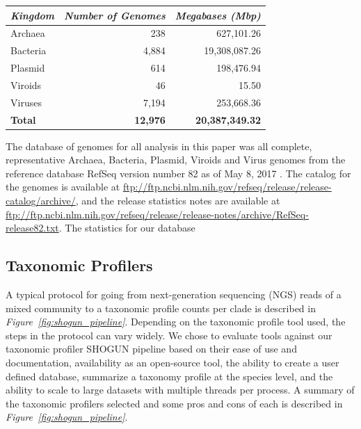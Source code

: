 \documentclass[conference,11pt]{IEEEtran}
\begin{document}
\begin{table}[hbt]
  \centering
  \begin{tabular}{l|r|r}
      \textit{Kingdom} & \textit{Number of Genomes} & \textit{Megabases (Mbp)} \\ \hline
      Archaea & 238 & 627,101.26\\ \hline
      Bacteria & 4,884 & 19,308,087.26\\ \hline
      Plasmid & 614 & 198,476.94\\ \hline
      Viroids & 46 & 15.50\\ \hline
      Viruses & 7,194 & 253,668.36\\ \hline \hline
      \textbf{Total} & \textbf{12,976} & \textbf{20,387,349.32}\\ 
  \end{tabular}
  \label{table:database_stats}
\end{table}

The database of genomes for all analysis in this paper was all complete, representative Archaea, Bacteria, Plasmid, Viroids and Virus genomes from the reference database RefSeq version number 82 as of May 8, 2017 \cite{tatusova_refseq_2014}. The catalog for the genomes is available at \url{ftp://ftp.ncbi.nlm.nih.gov/refseq/release/release-catalog/archive/}, and the release statistics notes are available at \url{ftp://ftp.ncbi.nlm.nih.gov/refseq/release/release-notes/archive/RefSeq-release82.txt}. The statistics for our database

\subsection{Taxonomic Profilers}

A typical protocol for going from next-generation sequencing (NGS) reads of a mixed community to a taxonomic profile counts per clade is described in \textit{Figure~\ref{fig:shogun_pipeline}}. Depending on the taxonomic profile tool used, the steps in the protocol can vary widely. We chose to evaluate tools against our taxonomic profiler SHOGUN \cite{benjamin_hillmann_knights-lab/shogun:_2017} pipeline based on their ease of use and documentation, availability as an open-source tool, the ability to create a user defined database, summarize a taxonomy profile at the species level, and the ability to scale to large datasets with multiple threads per process. A summary of the taxonomic profilers selected and some pros and cons of each is described in \textit{Figure~\ref{fig:shogun_pipeline}}.
\end{document}

